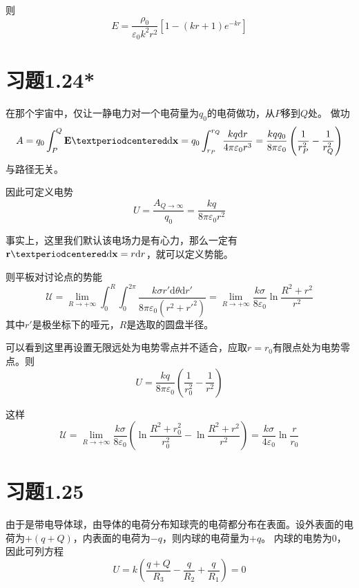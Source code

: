 \documentclass{SCIS2020cn}
\begin{document}
则
\begin{equation}
    E=\frac{\rho_0}{\varepsilon_0k^2r^2}[1-(kr+1)e^{-kr}]
\end{equation}


\section{习题1.24*}
在那个宇宙中，仅让一静电力对一个电荷量为$q_0$的电荷做功，从$P$移到$Q$处。
做功
\begin{equation}
    A=q_0\int_P^Q\bold{E}·\text{d}\bold{x}=q_0\int_{r_P}^{r_Q}\frac{kq\text{d}r}{4\pi\varepsilon_0r^3}=\frac{kqq_0}{8\pi\varepsilon_0}\left(\frac{1}{r_P^2}-\frac{1}{r_Q^2}\right)
\end{equation}
与路径无关。

因此可定义电势
\begin{equation}
    U=\frac{A_{Q\rightarrow\infty}}{q_0}=\frac{kq}{8\pi\varepsilon_0r^2}
\end{equation}


事实上，这里我们默认该电场力是有心力，那么一定有$\bold{r}·\text{d}\bold{x}=r\text{d}r$，就可以定义势能。

则平板对讨论点的势能
\begin{equation}
    \mathscr{U}=\lim_{R\rightarrow+\infty}\int_0^{R}\int_0^{2\pi}\frac{k\sigma{}r'\text{d}\theta\text{d}r'}{8\pi\varepsilon_0(r^2+r'^2)}=\lim_{R\rightarrow+\infty}\frac{k\sigma}{8\varepsilon_0}\ln\frac{R^2+r^2}{r^2}
\end{equation}
其中$r'$是极坐标下的哑元，$R$是选取的圆盘半径。

可以看到这里再设置无限远处为电势零点并不适合，应取$r=r_0$有限点处为电势零点。则
\begin{equation}
    U=\frac{kq}{8\pi\varepsilon_0}\left(\frac{1}{r_0^2}-\frac{1}{r^2}\right)
\end{equation}

这样
\begin{equation}
    \mathscr{U}=\lim_{R\rightarrow+\infty}\frac{k\sigma}{8\varepsilon_0}\left(\ln\frac{R^2+r_0^2}{r_0^2}-\ln\frac{R^2+r^2}{r^2}\right)=\frac{k\sigma}{4\varepsilon_0}\ln\frac{r}{r_0}
\end{equation}

\section{习题1.25}
由于是带电导体球，由导体的电荷分布知球壳的电荷都分布在表面。设外表面的电荷为$+(q+Q)$，内表面的电荷为$-q$，则内球的电荷量为$+q$。
内球的电势为0，因此可列方程
\begin{equation}
    U=k\left(\frac{q+Q}{R_3}-\frac{q}{R_2}+\frac{q}{R_1}\right)=0
\end{equation}
\end{document}
